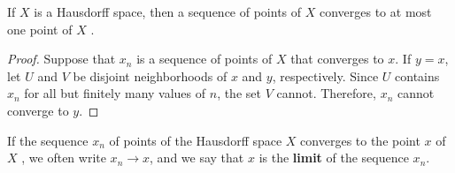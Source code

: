 \documentclass[a4paper,english,12pt]{article}
\begin{document}
\begin{thm}
If $X$ is a Hausdorff space, then a sequence of points of $X$ converges
to at most one point of $X$ .
\begin{proof}
Suppose that $x_n$ is a sequence of points of $X$ that converges to $x$. If $y = x$, let $U$ and $V$ be disjoint neighborhoods of $x$ and $y$, respectively. Since $U$ contains $x_n$ for all but finitely many values of $n$, the set $V$ cannot. Therefore, $x_n$ cannot converge
to $y$.
\end{proof}
\end{thm}
\begin{defn}
If the sequence $x_n$ of points of the Hausdorff space $X$ converges to the point $x$ of $X$ , we often write $x_n \rightarrow x$, and we say that $x$ is the \textbf{limit} of the sequence $x_n$.
\end{defn}


	
\end{document}
